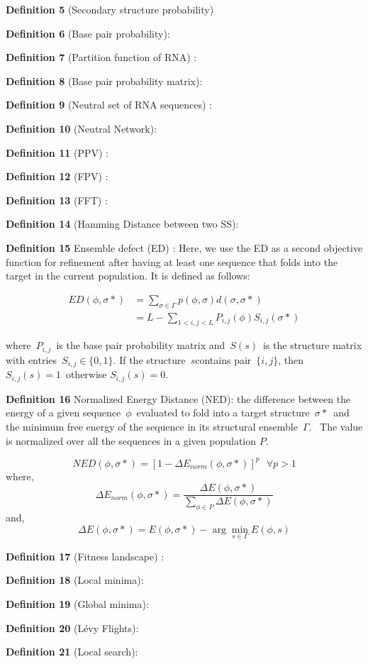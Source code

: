 \textbf{Definition 5} (Secondary structure probability)



\textbf{Definition 6} (Base pair probability): 

\textbf{Definition 7} (Partition function of RNA) : 

\textbf{Definition 8} (Base pair probability matrix): 

\textbf{Definition 9} (Neutral set of RNA sequences) : 

\textbf{Definition 10} (Neutral Network): 

\textbf{Definition 11}  (PPV) : 

\textbf{Definition 12} (FPV) : 

\textbf{Definition 13 } (FFT) : 

\textbf{Definition 14} (Hamming Distance between two SS): 

\textbf{Definition 15} Ensemble defect (ED) \citep{zadeh2011nucleic}: Here, we use the ED as a second objective function for refinement after having at least one sequence that folds into the target in the current population. It is defined as follows: ~

\begin{equation}
\label{ed}
\begin{split}
ED(\phi, \sigma*) &= \sum_{\sigma \in \Gamma}{p(\phi, \sigma)d(\sigma, \sigma*)}\\
&= L - \sum_{1<i,j<L} P_{i,j}(\phi)S_{i,j}(\sigma*)
\end{split}
\end{equation}

where~\(P_{i,j}\)~is the base pair probability matrix and~\(S(s)\)~is the structure matrix with entries~\(S_{i,j} \in  \{ 0, 1\}\). If the structure~\(s\)contains pair~\(\{i ,j\}\), then~\(S_{i,j}(s) = 1\)~otherwise \(S_{i,j}(s) = 0\).

\textbf{Definition 16} Normalized Energy Distance (NED): the difference between
the energy of a given sequence~\(\phi\)~evaluated to fold
into a target structure~\(\sigma*\)~and the minimum free energy
of the sequence in its structural ensemble~\(\Gamma\).~ The value is normalized over all the sequences in a given population $P$.  


\begin{equation}
\label{ned}
NED(\phi, \sigma*) = [1-\Delta E_{norm}(\phi, \sigma*)]^p \text{   } \forall p>1
\end{equation}
where,
\begin{equation}
\Delta E_{norm}(\phi, \sigma*) = \frac{\Delta E(\phi, \sigma*) }{\sum_{\phi \in P}{\Delta E(\phi, \sigma*)}}
\end{equation}
and,
\begin{equation}
\Delta E(\phi, \sigma*) = E(\phi, \sigma*) - \arg \min_{s \in \Gamma} E(\phi, s)
\end{equation}

\textbf{Definition 17} (Fitness landscape) : 


\textbf{Definition 18} (Local minima): 

\textbf{Definition 19} (Global minima): 

\textbf{Definition 20} (Lévy Flights): 

\textbf{Definition 21} (Local search): 

